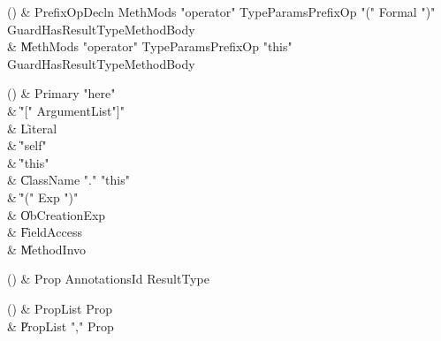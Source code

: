 \begin{bbgrammarappendix}{3.7in}

() & PrefixOpDecln \label{prod:PrefixOpDecln}  \: MethMods \xcd"operator" TypeParams\opt PrefixOp \xcd"(" Formal  \xcd")" Guard\opt HasResultType\opt MethodBody  \\

 &    \| MethMods \xcd"operator" TypeParams\opt PrefixOp \xcd"this" Guard\opt HasResultType\opt MethodBody \\

\end{bbgrammarappendix}

\begin{bbgrammarappendix}{4.3in}

() & Primary \label{prod:Primary}  \: \xcd"here"  \\

 &    \| \xcd"[" ArgumentList\opt \xcd"]" \\
 &    \| Literal \\
 &    \| \xcd"self" \\
 &    \| \xcd"this" \\
 &    \| ClassName \xcd"." \xcd"this" \\
 &    \| \xcd"(" Exp \xcd")" \\
 &    \| ObCreationExp \\
 &    \| FieldAccess \\
 &    \| MethodInvo \\

\end{bbgrammarappendix}

\begin{bbgrammarappendix}{4.6in}

() & Prop \label{prod:Prop}  \: Annotations\opt Id ResultType  \\


\end{bbgrammarappendix}

\begin{bbgrammarappendix}{4.2in}

() & PropList \label{prod:PropList}  \: Prop  \\

 &    \| PropList \xcd"," Prop \\

\end{bbgrammarappendix}

